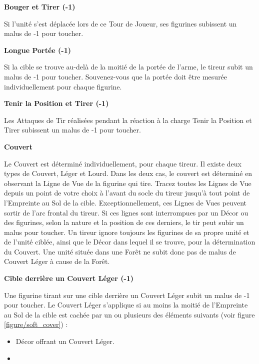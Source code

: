 \noindent\textbf{Bouger et Tirer (-1)}

Si l'unité s'est déplacée lors de ce Tour de Joueur, ses figurines subissent un malus de -1 pour toucher.

\noindent\textbf{Longue Portée (-1)}

Si la cible se trouve au-delà de la moitié de la portée de l'arme, le tireur subit un malus de -1 pour toucher. Souvenez-vous que la portée doit être mesurée individuellement pour chaque figurine.

\noindent\textbf{Tenir la Position et Tirer (-1)}

Les Attaques de Tir réalisées pendant la réaction à la charge Tenir la Position et Tirer subissent un malus de -1 pour toucher.

\noindent\textbf{Couvert}

Le Couvert est déterminé individuellement, pour chaque tireur. Il existe deux types de Couvert, Léger et Lourd. Dans les deux cas, le couvert est déterminé en observant la Ligne de Vue de la figurine qui tire. Tracez toutes les Lignes de Vue depuis un point de votre choix à l'avant du socle du tireur jusqu'à tout point de l'Empreinte au Sol de la cible. Exceptionnellement, ces Lignes de Vues peuvent sortir de l'arc frontal du tireur. Si ces lignes sont interrompues par un Décor ou des figurines, selon la nature et la position de ces derniers, le tir peut subir un malus pour toucher. Un tireur ignore toujours les figurines de sa propre unité et de l'unité ciblée, ainsi que le Décor dans lequel il se trouve, pour la détermination du Couvert. Une unité située dans une Forêt ne subit donc pas de malus de Couvert Léger à cause de la Forêt.

\noindent\textbf{Cible derrière un Couvert Léger (-1)}

Une figurine tirant sur une cible derrière un Couvert Léger subit un malus de -1 pour toucher. Le Couvert Léger s'applique si au moins la moitié de l'Empreinte au Sol de la cible est cachée par un ou plusieurs des éléments suivants (voir figure \ref{figure/soft_cover}) :
\begin{itemize}[label={-}]
\item Décor offrant un Couvert Léger.
\item {}
\end{itemize}

